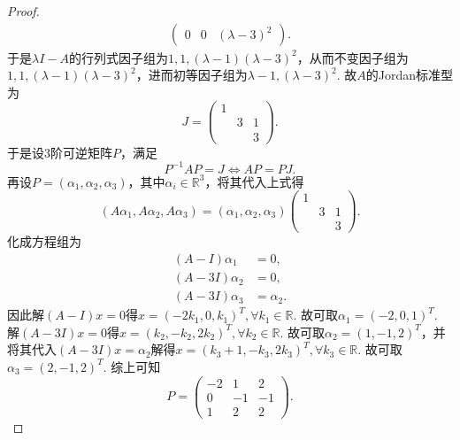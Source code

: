 \documentclass[../../main.tex]{subfiles}
\begin{document}
\begin{proof}
\begin{align*}
\begin{pmatrix}
0 & 0 & (\lambda - 3)^2
\end{pmatrix}.
\end{align*}
于是$\lambda I - A$的行列式因子组为$1, 1, (\lambda - 1)(\lambda - 3)^2$，从而不变因子组为$1, 1, (\lambda - 1)(\lambda - 3)^2$，进而初等因子组为$\lambda - 1, (\lambda - 3)^2$.
故$A$的Jordan标准型为
\[
J = 
\begin{pmatrix}
1 & & \\
& 3 & 1 \\
& & 3
\end{pmatrix}.
\]
于是设3阶可逆矩阵$P$，满足
\[
P^{-1}AP = J \Longleftrightarrow AP = PJ.
\]
再设$P = (\alpha_1, \alpha_2, \alpha_3)$，其中$\alpha_i \in \mathbb{R}^3$，将其代入上式得
\[
(A\alpha_1, A\alpha_2, A\alpha_3) = (\alpha_1, \alpha_2, \alpha_3)
\begin{pmatrix}
1 & & \\
& 3 & 1 \\
& & 3
\end{pmatrix}.
\]
化成方程组为
\begin{align*}
(A - I)\alpha_1 &= 0, \\
(A - 3I)\alpha_2 &= 0, \\
(A - 3I)\alpha_3 &= \alpha_2.
\end{align*}
因此解$(A - I)x = 0$得$x = (-2k_1, 0, k_1)^T, \forall k_1 \in \mathbb{R}$. 故可取$\alpha_1 = (-2, 0, 1)^T$. 解$(A - 3I)x = 0$得$x = (k_2, -k_2, 2k_2)^T, \forall k_2 \in \mathbb{R}$. 故可取$\alpha_2 = (1, -1, 2)^T$，并将其代入$(A - 3I)x = \alpha_2$解得$x = (k_3 + 1, -k_3, 2k_3)^T, \forall k_3 \in \mathbb{R}$. 故可取$\alpha_3 = (2, -1, 2)^T$.
综上可知
\[
P = 
\begin{pmatrix}
-2 & 1 & 2 \\
0 & -1 & -1 \\
1 & 2 & 2
\end{pmatrix}.
\]

\end{proof}
\end{document}
